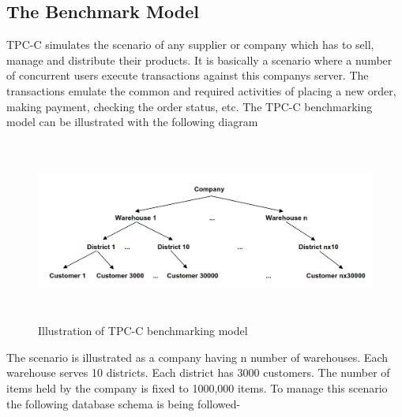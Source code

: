 \documentclass[12pt]{book}
\begin{document}
  \subsection{The Benchmark Model}
  TPC-C simulates the scenario of any supplier or company which has to sell, manage and distribute their products. 
  It is basically a scenario where a number of concurrent users execute transactions against this companys server. 
  The transactions emulate the common and required activities of placing a new order, making payment, checking the order status, etc.
  The TPC-C benchmarking model can be illustrated with the following diagram\cite{Bench}\cite{Standard}\cite{Tpcc-pdf}

  \begin{figure}[H]
   \centering
   \includegraphics[width=17cm, height=6cm]{images/tpcc_intro1}
   \caption{Illustration of TPC-C benchmarking model\label{fig:fig11_JMeter}}
  \end{figure}
  
  The scenario is illustrated as a company having n number of warehouses.
  Each warehouse serves 10 districts. Each district has 3000 customers. The number of items held by the company is fixed to 1000,000 items.
  To manage this scenario the following database schema is being followed-\\
  
\end{document}
